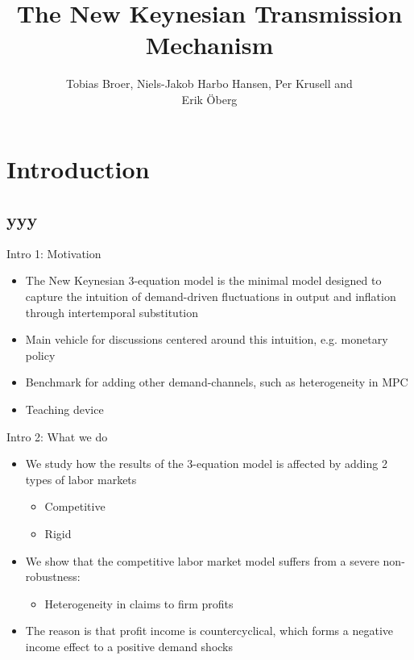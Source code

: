 \documentclass{beamer}
\title{The New Keynesian Transmission Mechanism}
\author{Tobias Broer, Niels-Jakob Harbo Hansen, Per Krusell and \\ Erik {\"O}berg}
\institute{Institute for International Economic Studies}
\newcommand{\bit}{\begin{itemize}}
\newcommand{\eit}{\end{itemize}}
\begin{document}
\begin{frame}
\maketitle
\end{frame}

\section{Introduction}
\subsection{yyy}


\begin{frame}{Intro 1: Motivation}

\bit
	\item The New Keynesian 3-equation model is the minimal model designed to capture the intuition of demand-driven fluctuations in output and inflation through intertemporal substitution
	\item Main vehicle for discussions centered around this intuition, e.g. monetary policy
	\item Benchmark for adding other demand-channels, such as heterogeneity in MPC
	\item Teaching device
\eit


\end{frame}

\begin{frame}{Intro 2: What we do}

\bit
		\item We study how the results of the 3-equation model is affected by adding 2 types of labor markets
		\bit
			\item Competitive
			\item Rigid
		\eit
		\item We show that the competitive labor market model suffers from a severe non-robustness: 
			\bit
				\item Heterogeneity in claims to firm profits
			\eit
		\item The reason is that profit income is countercyclical, which forms a negative income effect to a positive demand shocks 
\eit


\end{frame}
\end{document}
